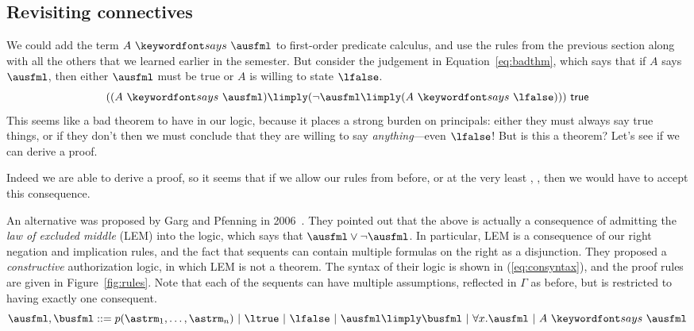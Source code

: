 \documentclass[11pt,twoside]{scrartcl}
\begin{document}
\subsection{Revisiting connectives}
We could add the term $\says{A}{\ausfml}$ to first-order predicate calculus, and use the rules from the previous section along with all the others that we learned earlier in the semester. But consider the judgement in Equation~\ref{eq:badthm}, which says that if $A$ says $\ausfml$, then either $\ausfml$ must be true or $A$ is willing to state $\lfalse$.
\begin{equation}
\label{eq:badthm}
((\says{A}{\ausfml}) \limply (\lnot\ausfml \limply (\says{A}{\lfalse})))~\strue
\end{equation}
This seems like a bad theorem to have in our logic, because it places a strong burden on principals: either they must always say true things, or if they don't then we must conclude that they are willing to say \emph{anything}---even $\lfalse$! But is this a theorem? Let's see if we can derive a proof.
\begin{sequentdeduction}[array]
 {
}
\end{sequentdeduction}
Indeed we are able to derive a proof, so it seems that if we allow our rules from before, or at the very least , , then we would have to accept this consequence.

An alternative was proposed by Garg and Pfenning in 2006~\cite{Garg06}. They pointed out that the above is actually a consequence of admitting the \emph{law of excluded middle} (LEM) into the logic, which says that $\ausfml \lor \lnot\ausfml$. In particular, LEM is a consequence of our right negation and implication rules, and the fact that sequents can contain multiple formulas on the right as a disjunction.
They proposed a \emph{constructive} authorization logic, in which LEM is not a theorem. The syntax of their logic is shown in (\ref{eq:consyntax}), and the proof rules are given in Figure~\ref{fig:rules}.
Note that each of the sequents can have multiple assumptions, reflected in $\Gamma$ as before, but is restricted to having exactly one consequent.
\begin{equation}
\label{eq:consyntax}
\ausfml,\busfml \bebecomes
p(\astrm_1,\ldots,\astrm_n) \alternative
\ltrue \alternative
\lfalse \alternative
\ausfml \limply \busfml \alternative
\forall x.\ausfml \alternative
\says{A}{\ausfml}
\end{equation}
\end{document}
